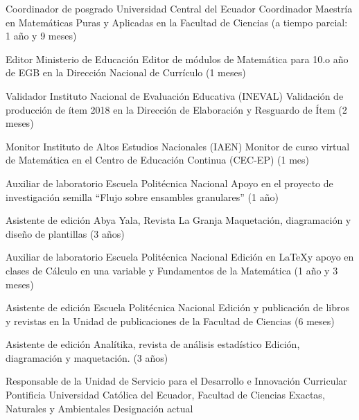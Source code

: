 \documentclass[
    a4paper,
    maincolor=cvblue!70!blue,
    sidecolor=gray!30,
    sectioncolor=cvblue!70!blue,
    sidebarwidth=7.5cm,
    topbottommargin=20pt,
    leftrightmargin=20pt,
]{fortysecondscv}
\begin{document}

    {Coordinador de posgrado}
    {Universidad Central del Ecuador}
    {Coordinador Maestría en Matemáticas Puras y Aplicadas en la Facultad de Ciencias (a tiempo parcial: 1 año y 9 meses)}

    {Editor}
    {Ministerio de Educación}
    {Editor de módulos de Matemática para 10.o año de EGB en la Dirección Nacional de Currículo (1 meses)}

    {Validador}
    {Instituto Nacional de Evaluación Educativa (INEVAL)}
    {Validación de producción de ítem 2018 en la Dirección de Elaboración y Resguardo de Ítem (2 meses)}

    {Monitor}
    {Instituto de Altos Estudios Nacionales (IAEN)}
    {Monitor de curso virtual de Matemática en el Centro de Educación Continua (CEC-EP) (1 mes)}

    {Auxiliar de laboratorio}
    {Escuela Politécnica Nacional}
    {Apoyo en el proyecto de investigación semilla ``Flujo sobre ensambles granulares'' (1 año)}

    {Asistente de edición}
    {Abya Yala, Revista La Granja}
    {Maquetación, diagramación y diseño de plantillas (3 años)}

    {Auxiliar de laboratorio}
    {Escuela Politécnica Nacional}
    {Edición en \LaTeX y apoyo en clases de Cálculo en una variable y Fundamentos de la Matemática (1 año y 3 meses)}

    {Asistente de edición}
    {Escuela Politécnica Nacional}
    {Edición y publicación de libros y revistas en la Unidad de publicaciones de la Facultad de Ciencias (6 meses)}

    {Asistente de edición}
    {Analítika, revista de análisis estadístico}
    {Edición, diagramación y maquetación. (3 años)}


\makebacksidebar


    {Responsable de la Unidad de Servicio para el Desarrollo e Innovación Curricular}
    {Pontificia Universidad Católica del Ecuador, Facultad de Ciencias Exactas, Naturales y Ambientales}
    {Designación actual}
\end{document}
